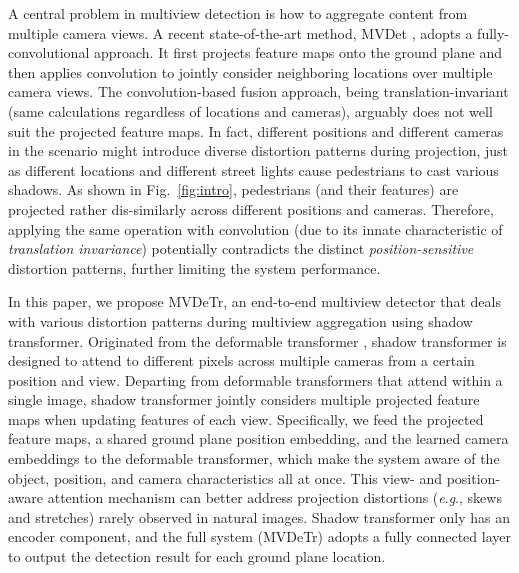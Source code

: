 \documentclass[sigconf,authorversion,nonacm]{acmart}
\newcommand{\eg}{\textit{e}.\textit{g}.}
\begin{document}
A central problem in multiview detection is how to aggregate content from multiple camera views. 
A recent state-of-the-art method, MVDet \cite{hou2020multiview}, adopts a fully-convolutional approach. It first projects feature maps onto the ground plane and then applies convolution to jointly consider neighboring locations over multiple camera views. 
The convolution-based fusion approach, being translation-invariant (same calculations regardless of locations and cameras), arguably does not well suit the projected feature maps. In fact, different positions and different cameras in the scenario might introduce diverse distortion patterns during projection, just as different locations and different street lights cause pedestrians to cast various shadows. 
As shown in Fig.~\ref{fig:intro}, pedestrians (and their features) are projected rather dis-similarly across different positions and cameras. 
Therefore, applying the same operation with convolution (due to its innate characteristic of \textit{translation invariance}) potentially contradicts the distinct \textit{position-sensitive} distortion patterns, further limiting the system performance. 

In this paper, we propose MVDeTr, an end-to-end multiview detector that deals with various distortion patterns during multiview aggregation using shadow transformer. Originated from the deformable transformer \cite{zhu2021deformable}, shadow transformer is designed to attend to different pixels across multiple cameras from a certain position and view. 
Departing from deformable transformers that attend within a single image, shadow transformer jointly considers multiple projected feature maps when updating features of each view. 
Specifically, we feed the projected feature maps, a shared ground plane position embedding, and the learned camera embeddings to the deformable transformer, which make the system aware of the object, position, and camera characteristics all at once. 
This view- and position-aware attention mechanism can better address projection distortions (\eg, skews and stretches) rarely observed in natural images. 
Shadow transformer only has an encoder component, and the full system (MVDeTr) adopts a fully connected layer to output the detection result for each ground plane location.
\end{document}
